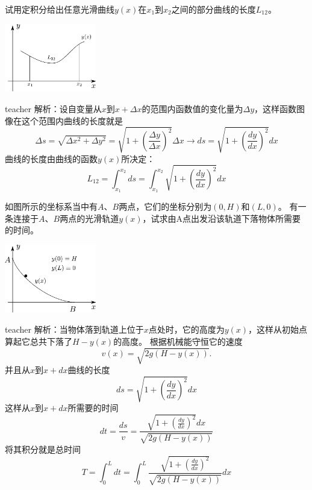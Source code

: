\begin{example}
试用定积分给出任意光滑曲线$y(x)$在$x_1$到$x_2$之间的部分曲线的长度$L_{12}$。
\begin{flushright}
\includegraphics[width=0.3\textwidth]{images/cal-20.pdf} 
\end{flushright}
\begin{taggedblock}{teacher}
\noindent
解析：设自变量从$x$到$x+\Delta x$的范围内函数值的变化量为$\Delta y$，这样函数图像在这个范围内曲线的长度就是
\[
\Delta s=\sqrt{\Delta x^2+\Delta y^2}=\sqrt{1+\left(\frac{\Delta y}{\Delta x}\right)^2}\Delta x \rightarrow ds= \sqrt{1+\left(\frac{d y}{d x}\right)^2}d x
\]
曲线的长度由曲线的函数$y(x)$所决定：
\[
L_{12}=\int_{x_1}^{x_2}ds=\int_{x_1}^{x_2}\sqrt{1+\left(\frac{d y}{d x}\right)^2}dx
\]
\end{taggedblock}
\end{example}


\begin{example}
如图所示的坐标系当中有$A$、$B$两点，它们的坐标分别为$(0,H)$和$(L,0)$。
有一条连接于$A$、$B$两点的光滑轨道$y(x)$，试求由A点出发沿该轨道下落物体所需要的时间。
\begin{flushright}
\includegraphics[width=0.3\textwidth]{images/cal-21.pdf} 
\end{flushright}
\begin{taggedblock}{teacher}
\noindent
解析：当物体落到轨道上位于$x$点处时，它的高度为$y(x)$，这样从初始点算起它总共下落了$H-y(x)$的高度。
根据机械能守恒它的速度
\[
v(x) = \sqrt{2g(H-y(x))}.
\]
并且从$x$到$x+dx$曲线的长度
\[
ds = \sqrt{1+(\frac{dy}{dx})^2}dx
\]
这样从$x$到$x+dx$所需要的时间
\[
dt = \frac{ds}{v} = \frac{\sqrt{1+(\frac{dy}{dx})^2}dx}{\sqrt{2g(H-y(x))}}
\]
将其积分就是总时间
\[
T=\int_0^L dt = \int_0^L \frac{\sqrt{1+(\frac{dy}{dx})^2}}{\sqrt{2g(H-y(x))}}dx
\]

\end{taggedblock}
\end{example}


